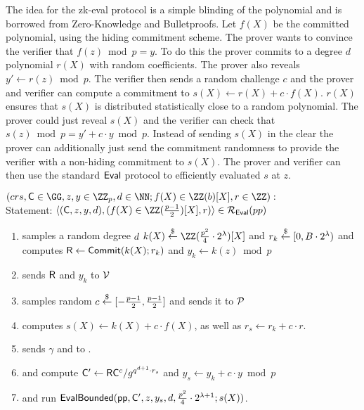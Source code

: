 The idea for the zk-eval protocol is a simple blinding of the polynomial and is borrowed from Zero-Knowledge \cite{EPRINT:ChiForSpo17} and Bulletproofs\cite{EC:BCCGP16,SP:BBBPWM18}. Let $f(X)$ be the committed polynomial, using the hiding commitment scheme. The prover wants to convince the verifier that $f(z)\bmod p=y$. To do this the prover commits to a degree $d$ polynomial $r(X)$ with random coefficients. The prover also reveals $y'\gets r(z)\bmod p$. The verifier then sends a random challenge $c$ and the prover and verifier can compute a commitment to $s(X)\gets r(X)+c\cdot f(X)$. $r(X)$ ensures that $s(X)$ is distributed statistically close to a random polynomial. The prover could just reveal $s(X)$ and the verifier can check that $s(z)\bmod p=y'+c \cdot y\bmod p$. Instead of sending $s(X)$ in the clear the prover can additionally just send the commitment randomness to provide the verifier with a non-hiding commitment to $s(X)$. The prover and verifier can then use the standard $\textsf{{Eval}}$ protocol to efficiently evaluated $s$ at $z$.
 \noindent\begin{mdframed}[userdefinedwidth=\textwidth]
\begin{minipage}{\textwidth}
	\begin{flushleft}
	$(crs,\gr{C} \in \GG,z,y \in \ZZ_p,d\in \NN;f(X)\in \ZZ(b)[X],r \in \ZZ):$\\
		Statement: $\langle(\gr{C},z,y,d),(f(X) \in \ZZ(\frac{p-1}{2})[X],r)\rangle \in \mathcal{R}_\eval(pp)$\\
	\begin{enumerate}[nolistsep]
		    \item \prover samples a random degree $d$ $k(X) \sample \ZZ(\frac{p^2}{4}\cdot 2^\lambda)[X]$ and $r_k \overset{\$}{\gets} [0,B\cdot 2^\lambda)$ and computes $\mathsf{R}\gets \textsf{{Commit}}(k(X);r_k)$ and $y_k\gets k(z) \bmod p$
		    \item \prover sends $\mathsf{R}$ and $y_k$ to $\mathcal{V}$
		    \item \verifier samples random $c\overset{\$}{\gets} [-\frac{p-1}{2},\frac{p-1}{2}]$ and sends it to $\mathcal{P}$
		    \item \prover computes $s(X)\gets k(X) + c \cdot f(X)$, as well as $r_s\gets r_k+ c\cdot r$. 
		    \item \prover sends $\gamma$ and to \verifier.
		    \item \prover and \verifier compute $\mathsf{C}'\gets \mathsf{R}\mathsf{C}^c/g^{q^{d+1}\cdot r_s}$ and $y_s\gets y_k+c \cdot y \bmod p$
		    \item \prover and \verifier run $\textsf{{EvalBounded}}(\textsf{pp},\mathsf{C}',z,y_s,d,\frac{p^2}{4}\cdot 2^{\lambda+1};s(X))$.
		   		\end{enumerate}
	\end{flushleft}
\end{minipage}
\end{mdframed}



